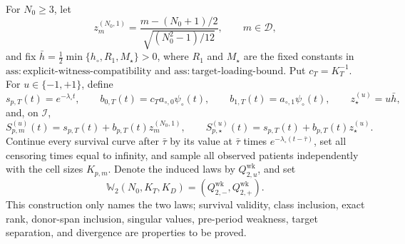 For \(N_0\ge3\), let
\[
 z_m^{(N_0,1)}=
 \frac{m-(N_0+1)/2}{\sqrt{(N_0^2-1)/12}},
 \qquad m\in\mathcal D,
\]
and fix \(\bar h=\frac12\min\{h_\circ,R_1,M_\star\}>0\), where \(R_1\) and \(M_\star\) are the fixed constants in \(\mathrm{ass:explicit\mbox{-}witness\mbox{-}compatibility}\) and \(\mathrm{ass:target\mbox{-}loading\mbox{-}bound}\).  Put \(c_T=K_T^{-1}\).  For \(u\in\{-1,+1\}\), define
\[
 s_{p,T}(t)=e^{-\lambda_\circ t},
 \qquad
 b_{0,T}(t)=c_Ta_{\circ,0}\psi_\circ(t),
 \qquad
 b_{1,T}(t)=a_{\circ,1}\psi_\circ(t),
 \qquad
 z_\star^{(u)}=u\bar h,
\]
and, on \(\mathcal I\),
\[
 S_{p,m}^{(u)}(t)=s_{p,T}(t)+b_{p,T}(t)z_m^{(N_0,1)},
 \qquad
 S_{p,\star}^{(u)}(t)=s_{p,T}(t)+b_{p,T}(t)z_\star^{(u)}.
\]
Continue every survival curve after \(\bar\tau\) by its value at \(\bar\tau\) times \(e^{-\lambda_\circ(t-\bar\tau)}\), set all censoring times equal to infinity, and sample all observed patients independently with the cell sizes \(K_{p,m}\).  Denote the induced laws by \(Q_{2,u}^{\mathrm{wk}}\), and set
\[
 \mathbb W_2(N_0,K_T,K_D)
   =(Q_{2,-}^{\mathrm{wk}},Q_{2,+}^{\mathrm{wk}}).
\]
This construction only names the two laws; survival validity, class inclusion, exact rank, donor-span inclusion, singular values, pre-period weakness, target separation, and divergence are properties to be proved.